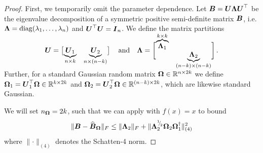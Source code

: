 \documentclass[12pt]{article}
\begin{document}
\begin{proof}
    First, we temporarily omit the parameter dependence. Let $\boldsymbol{B} = \boldsymbol{U} \boldsymbol{\Lambda} \boldsymbol{U}^{\top}$ be the eigenvalue decomposition of a symmetric positive semi-definite matrix $\boldsymbol{B}$, i.e. $\boldsymbol{\Lambda} = \operatorname{diag}(\lambda_1, \dots, \lambda_n)$ and $\boldsymbol{U}^{\top} \boldsymbol{U}= \boldsymbol{I}_n$. We define the matrix partitions
    \begin{equation}
        \rule[\dimexpr-2ex-\ht\strutbox]{0pt}{\dimexpr2ex+4ex+\baselineskip}
        \mtx{U} = \begin{bmatrix}
            \smash{\underbrace{\mtx{U}_1}_{n \times k}} & \smash{\underbrace{\mtx{U}_2}_{n \times (n-k)}}
        \end{bmatrix}
        \quad \text{and} \quad
        \mtx{\Lambda} =
        \begin{bmatrix}
            \smash{\overbrace{\mtx{\Lambda}_1}^{k \times k}} & \\ & \smash{\underbrace{\mtx{\Lambda}_2}_{(n-k) \times (n-k)}}
        \end{bmatrix}.
    \end{equation}
    Further, for a standard Gaussian random matrix $\boldsymbol{\Omega} \in \mathbb{R}^{n \times 2k}$ we define $\boldsymbol{\Omega}_1 = \boldsymbol{U}_1^{\top} \boldsymbol{\Omega} \in \mathbb{R}^{k \times 2k}$ and $\boldsymbol{\Omega}_2 = \boldsymbol{U}_2^{\top} \boldsymbol{\Omega} \in \mathbb{R}^{(n - k) \times 2k}$, which are likewise standard Gaussian.

    We will set $n_{\boldsymbol{\Omega}} = 2k$, such that we can apply \cite[theorem B.1]{persson-2023-randomized-lowrank} with $f(x) = x$ to bound
    \begin{equation}
        \lVert \boldsymbol{B} - \widehat{\boldsymbol{B}}_{\boldsymbol{\Omega}} \rVert _F 
        \leq  \lVert \boldsymbol{\Lambda}_2 \rVert _F + \lVert \boldsymbol{\Lambda}_2^{{}^{1}{\mskip -5mu/\mskip -3mu}_{2}} \boldsymbol{\Omega}_2 \boldsymbol{\Omega}_1^{\dagger} \rVert _{(4)}^2
        \label{equ:nystrom-proof-persson-bonud}
    \end{equation}
    where $\lVert \cdot \rVert _{(4)}$ denotes the Schatten-4 norm.
    

\end{proof}
\end{document}
